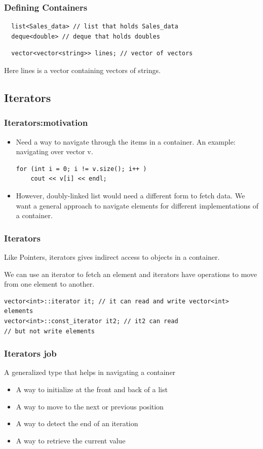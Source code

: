 \documentclass{beamer}
\newtheorem{Key points}{Key points}
\begin{document}
  \begin{frame}[fragile]
  \frametitle{Defining Containers}
 \begin{lstlisting}
  list<Sales_data> // list that holds Sales_data
  deque<double> // deque that holds doubles
 \end{lstlisting}
\begin{lstlisting}
  vector<vector<string>> lines; // vector of vectors
 \end{lstlisting}
   Here lines is a vector containing vectors of strings.
\end{frame}

\subsection{Iterators}
 \begin{frame}[fragile]
\frametitle{Iterators:motivation}
\begin{itemize}
\item Need a way to navigate through the items in a container.
An example: navigating over vector v.
\begin{lstlisting}
for (int i = 0; i != v.size(); i++ )
	cout << v[i] << endl;
\end{lstlisting}
\item However, doubly-linked list would need a different form to fetch data.
We want a general approach to navigate elements for different implementations of a container.
\end{itemize}
\end{frame} 
 \begin{frame}[fragile]
\frametitle{Iterators}
    \begin{definition}
      Like Pointers, iterators gives indirect access to objects in a
      container.
    \end{definition}
   We can use an iterator to fetch an element and iterators have
   operations to move from one element to another.
\begin{lstlisting} 
vector<int>::iterator it; // it can read and write vector<int> elements
vector<int>::const_iterator it2; // it2 can read
// but not write elements
\end{lstlisting}
\end{frame}
 \begin{frame}[fragile]
\frametitle{Iterators job}
 A generalized type that helps in navigating a container
\begin{itemize}
\item A way to initialize at the front and back of a list
\item A way to move to the next or previous position
\item A way to detect the end of an iteration
\item A way to retrieve the current value
\end{itemize}
\end{frame}
\end{document}
